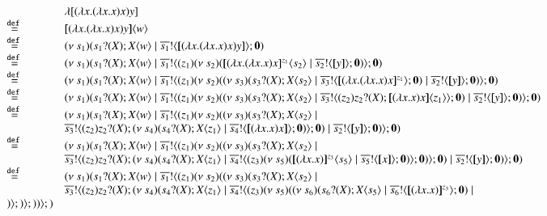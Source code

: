 \[
\begin{array}{ll}
	& \lambda[(\labs{x}{(\labs{x}{x})x}) y ]\\
	\defeq &\appl{\map{(\labs{x}{(\labs{x}{x})x}) y }}{w} \\
	\defeq&
	\newsp{s_1}{ \binp{s_1}{X} \appl{X}{w} \Par \bout{\dual{s_1}}{\map{(\labs{x}{(\labs{x}{x})x}) y }} \inact}\\
	\defeq&
	\newsp{s_1}{ \binp{s_1}{X} \appl{X}{w} \Par \bout{\dual{s_1}}{\abs{z_1}{\newsp{s_2}{\appl{\map{(\labs{x}{(\labs{x}{x})x}}^{z_1}}{s_2} \Par \bout{\dual{s_2}}{\map{y}}\inact }}} \inact}\\
	\defeq&
	\newsp{s_1}{ \binp{s_1}{X} \appl{X}{w} \Par \bout{\dual{s_1}}{\abs{z_1}{\newsp{s_2}{\newsp{s_3}{ \binp{s_3}{X} \appl{X}{s_2} \Par \bout{\dual{s_3}}{\map{(\labs{x}{(\labs{x}{x})x}}^{z_1}} \inact} \Par \bout{\dual{s_2}}{\map{y}}\inact }}} \inact}\\
	\defeq&
	\newsp{s_1}{ \binp{s_1}{X} \appl{X}{w} \Par \bout{\dual{s_1}}{\abs{z_1}{\newsp{s_2}{\newsp{s_3}{ \binp{s_3}{X} \appl{X}{s_2} \Par \bout{\dual{s_3}}{\abs{z_2}{\binp{z_2}{X} \appl{\map{(\labs{x}{x})x}}{z_1}}} \inact} \Par \bout{\dual{s_2}}{\map{y}}\inact }}} \inact}\\
	\defeq&
	\newsp{s_1}{ \binp{s_1}{X} \appl{X}{w} \Par \bout{\dual{s_1}}{\abs{z_1}{\newsp{s_2}{\newsp{s_3}{ \binp{s_3}{X} \appl{X}{s_2} \Par \\
	& \bout{\dual{s_3}}{\abs{z_2}{\binp{z_2}{X} \newsp{s_4}{ \binp{s_4}{X} \appl{X}{z_1} \Par \bout{\dual{s_4}}{\map{(\labs{x}{x})x}} \inact}}} \inact} \Par \bout{\dual{s_2}}{\map{y}}\inact }}} \inact}
	\\
	\defeq&
	\newsp{s_1}{ \binp{s_1}{X} \appl{X}{w} \Par \bout{\dual{s_1}}{\abs{z_1}{\newsp{s_2}{\newsp{s_3}{ \binp{s_3}{X} \appl{X}{s_2} \Par \\
	& \bout{\dual{s_3}}{\abs{z_2}{\binp{z_2}{X} \newsp{s_4}{ \binp{s_4}{X} \appl{X}{z_1} \Par \bout{\dual{s_4}}{\abs{z_3}{\newsp{s_5}{ \appl{\map{(\labs{x}{x})}^{z_3}}{s_5} \Par \bout{\dual{s_5}}{\map{x}} \inact }}} \inact}}} \inact} \Par \bout{\dual{s_2}}{\map{y}}\inact }}} \inact}\\
	\defeq&
	\newsp{s_1}{ \binp{s_1}{X} \appl{X}{w} \Par \bout{\dual{s_1}}{\abs{z_1}{\newsp{s_2}{\newsp{s_3}{ \binp{s_3}{X} \appl{X}{s_2} \Par \\
	& \bout{\dual{s_3}}{\abs{z_2}{\binp{z_2}{X} \newsp{s_4}{ \binp{s_4}{X} \appl{X}{z_1} \Par \bout{\dual{s_4}}{\abs{z_3}{\newsp{s_5}{ \newsp{s_6}{ \binp{s_6}{X} \appl{X}{s_5} \Par \bout{\dual{s_6}}{\map{(\labs{x}{x})}^{z_3}} \inact} \Par\\
}}}}}}}}}}}
\end{array}\]
